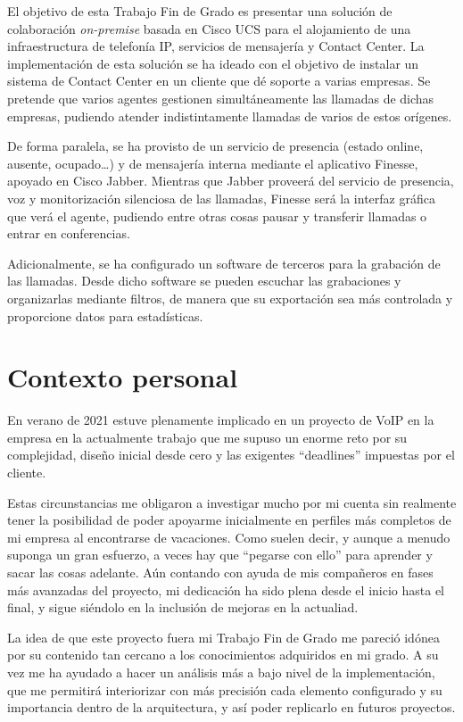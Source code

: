 \documentclass[a4paper, 12pt]{book}
\begin{document}
El objetivo de esta Trabajo Fin de Grado es presentar una solución de colaboración \emph{on-premise} basada en Cisco UCS para el alojamiento de una infraestructura de telefonía IP, servicios de mensajería y Contact Center.
La implementación de esta solución se ha ideado con el objetivo de instalar un sistema de Contact Center en un cliente que dé soporte a varias empresas.
Se pretende que varios agentes gestionen simultáneamente las llamadas de dichas empresas, pudiendo atender indistintamente llamadas de varios de estos orígenes.

De forma paralela, se ha provisto de un servicio de presencia (estado online, ausente, ocupado\ldots) y de mensajería interna mediante el aplicativo Finesse, apoyado en Cisco Jabber.
Mientras que Jabber proveerá del servicio de presencia, voz y monitorización silenciosa de las llamadas, Finesse será la interfaz gráfica que verá el agente, pudiendo entre otras cosas pausar y transferir llamadas o entrar en conferencias.

Adicionalmente, se ha configurado un software de terceros para la grabación de las llamadas. Desde dicho software se pueden escuchar las grabaciones y organizarlas mediante filtros, de manera que su exportación sea más controlada y proporcione datos para estadísticas.



\section{Contexto personal}
En verano de 2021 estuve plenamente implicado en un proyecto de VoIP en la empresa en la actualmente trabajo que me supuso un enorme reto por su complejidad, diseño inicial desde cero y las exigentes ``deadlines'' impuestas por el cliente.

Estas circunstancias me obligaron a investigar mucho por mi cuenta sin realmente tener la posibilidad de poder apoyarme inicialmente en perfiles más completos de mi empresa al encontrarse de vacaciones.
Como suelen decir, y aunque a menudo suponga un gran esfuerzo, a veces hay que ``pegarse con ello'' para aprender y sacar las cosas adelante.
Aún contando con ayuda de mis compañeros en fases más avanzadas del proyecto, mi dedicación ha sido plena desde el inicio hasta el final, y sigue siéndolo en la inclusión de mejoras en la actualiad.

La idea de que este proyecto fuera mi Trabajo Fin de Grado me pareció idónea por su contenido tan cercano a los conocimientos adquiridos en mi grado. A su vez me ha ayudado a hacer un análisis más a bajo nivel de la implementación, que me permitirá interiorizar con más precisión cada elemento configurado y su importancia dentro de la arquitectura, y así poder replicarlo en futuros proyectos.
\end{document}
